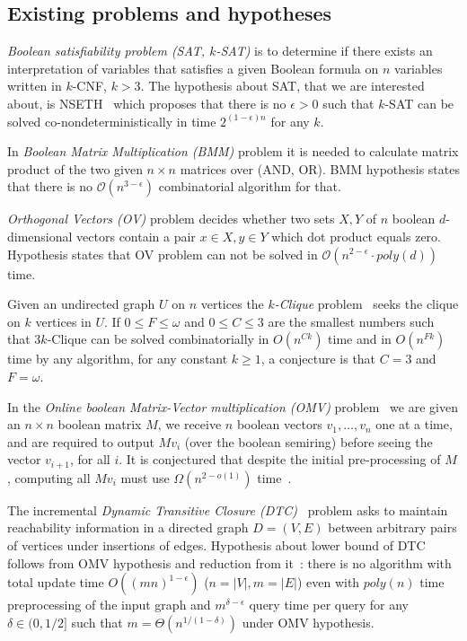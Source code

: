 \documentclass[acmsmall,review,nonacm]{acmart}\settopmatter{printfolios=true,printccs=false,printacmref=false}
\begin{document}
	\subsection{Existing problems and hypotheses}
	
	
	\emph{Boolean satisfiability problem (SAT, $k$-SAT)} is to determine if there exists an interpretation of variables that satisfies a given Boolean formula on $n$ variables written in $k$-CNF, $k > 3$. The hypothesis about SAT, that we are interested about, is NSETH~\cite{10.1145/2840728.2840746} which proposes that there is no $\epsilon > 0$ such that $k$-SAT can be solved co-nondeterministically in time $2^{(1 - \epsilon) n}$ for any $k$.
	
	In \emph{Boolean Matrix Multiplication (BMM)} problem it is needed to calculate matrix product of the two given $n \times n$ matrices over (AND, OR). BMM hypothesis states that there is no $\mathcal{O}(n^{3 - \epsilon})$ combinatorial algorithm for that. 
	
	\emph{Orthogonal Vectors (OV)} problem decides whether two sets $X, Y$ of $n$ boolean $d$-dimensional vectors contain a pair $x \in X, y \in Y$ which dot product equals zero. Hypothesis states that OV problem can not be solved in $\mathcal{O}(n^{2 - \epsilon} \cdot poly(d))$ time. 
	
	Given an undirected graph $U$ on $n$ vertices the \emph{$k$-Clique} problem~\cite{abboud2018if} seeks the clique on $k$ vertices in $U$.  If $0 \leq F \leq \omega$ and $0 \leq C \leq 3$ are the smallest numbers such that $3k$-Clique can be solved combinatorially in $O(n^{Ck})$ time and in $O(n^{Fk})$ time by any algorithm, for any constant $k \geq 1$, a conjecture is that $C = 3$ and $F = \omega$.
	
	In the \emph{Online boolean Matrix-Vector multiplication (OMV)} problem~\cite{10.5555/3039686.3039828} we are given an $n \times n$ boolean matrix $M$, we receive $n$ boolean vectors $v_1, \ldots, v_n$ one at a time, and are required to output $Mv_i$ (over the boolean semiring) before seeing the vector $v_{i+1}$, for all $i$. It is conjectured that despite the initial pre-processing of $M$, computing all $Mv_i$ must use $\Omega(n^{2-o(1)})$ time~\cite{8948597}.
	
	The incremental \emph{Dynamic Transitive Closure (DTC)}~\cite{Hanauer2020FasterFD} problem asks to maintain reachability information in a directed graph $D = (V, E)$ between arbitrary pairs of vertices under insertions of edges. Hypothesis about lower bound  of DTC follows from OMV hypothesis and reduction from it~\cite{10.1145/2746539.2746609}: there is no algorithm with total update time $O((mn)^{1 - \epsilon})$ ($n = |V|, m = |E|$) even with $poly(n)$ time preprocessing of the input graph and $m^{\delta - \epsilon}$ query time per query for any $\delta \in (0, 1/2]$ such that $m = \Theta(n^{1/(1-\delta)})$ under OMV hypothesis.
	
\end{document}
